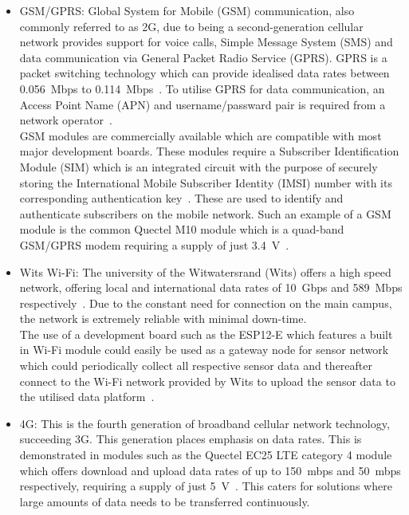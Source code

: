\documentclass[10pt,twocolumn]{witseiepaper}
\begin{document}
			\begin{itemize}
				
				\item GSM/GPRS:
				Global System for Mobile (GSM) communication, also commonly referred to as 2G, due to being a second-generation cellular network provides support for voice calls, Simple Message System (SMS) and data communication via General Packet Radio Service (GPRS). GPRS is a packet switching technology which can provide idealised data rates between 0.056~Mbps to 0.114~Mbps~\cite{gprs}. To utilise GPRS for data communication, an Access Point Name (APN) and username/passward pair is required from a network operator~\cite{gprs}.\\
				
				GSM modules are commercially available which are compatible with most major development boards. These modules require a Subscriber Identification Module (SIM) which is an integrated circuit with the purpose of securely storing the International Mobile Subscriber Identity (IMSI) number with its corresponding authentication key~\cite{imsi}. These are used to identify and authenticate subscribers on the mobile network. Such an example of a GSM module is the common Quectel M10 module which is a quad-band GSM/GPRS modem requiring a supply of just 3.4~V~\cite{m10}.\\

				\item Wits Wi-Fi:
				The university of the Witwatersrand (Wits) offers a high speed network, offering local and international data rates of 10~Gbps and 589~Mbps respectively~\cite{wits-speed}. Due to the constant need for connection on the main campus, the network is extremely reliable with minimal down-time.\\
				
				The use of a development board such as the ESP12-E which features a built in Wi-Fi module could easily be used as a gateway node for sensor network which could periodically collect all respective sensor data and thereafter connect to the Wi-Fi network provided by Wits to upload the sensor data to the utilised data platform~\cite{esp12e}.\\
			
				\item 4G:
				This is the fourth generation of broadband cellular network technology, succeeding 3G. This generation places emphasis on data rates. This is demonstrated in modules such as the Quectel EC25 LTE category 4 module which offers download and upload data rates of up to 150~mbps and 50~mbps respectively, requiring a supply of just 5~V~\cite{ec25}. This caters for solutions where large amounts of data needs to be transferred continuously.

			\end{itemize}
\end{document}
